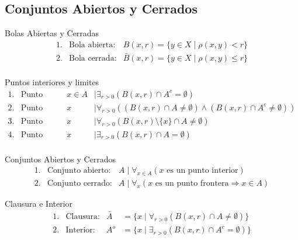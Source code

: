 \documentclass[a4paper,11pt]{article}
\begin{document}
\newpage
\subsection{Conjuntos Abiertos y Cerrados}

\begin{definicion*}{Bolas Abiertas y Cerradas}{}
  \[
  \begin{array}{lll}
    1. & \text{Bola abierta:} & B(x,r) = \{ y \in X \mid \rho(x,y) < r \} \\
    2. & \text{Bola cerrada:} & \bar{B}(x,r) = \{ y \in X \mid \rho(x,y) \leq r \} \\
  \end{array}
  \]
\end{definicion*}

\begin{definicion*}{Puntos interiores y limites}{} 
  \[
  \begin{array}{llll}
    1. & \text{Punto interior:} & x \in A &\mid \exists_{r > 0} (B(x,r) \cap A^c = \emptyset) \\
    2. & \text{Punto frontera:} & x &\mid \forall_{r > 0} ((B(x,r) \cap A \neq \emptyset) \wedge (B(x,r) \cap A^c \neq \emptyset)) \\
    3. & \text{Punto limite:} & x &\mid \forall_{r > 0} (B(x,r)\setminus\{x\} \cap A \neq \emptyset) \\
    4. & \text{Punto exterior:} & x &\mid \exists_{r > 0} (B(x,r) \cap A = \emptyset) \\
  \end{array}
  \]
\end{definicion*}

\begin{definicion*}{Conjuntos Abiertos y Cerrados}{}
  \[
  \begin{array}{lll}
    1. & \text{Conjunto abierto:} & A \mid \forall_{x \in A} (x \text{ es un punto interior}) \\
    2. & \text{Conjunto cerrado:} & A \mid \forall_{x} (x \text{ es un punto frontera} \Rightarrow x \in A)
  \end{array}
  \]
\end{definicion*}

\begin{definicion*}{Clausura e Interior}{}
  \[
  \begin{array}{llll}
    1. & \text{Clausura:} & \bar{A} &= \{ x \mid \forall_{r > 0} (B(x,r) \cap A \neq \emptyset) \} \\
    2. & \text{Interior:} & A^o &= \{ x \mid \exists_{r > 0} (B(x,r) \cap A^c = \emptyset) \} \\
  \end{array}
  \]
\end{definicion*}
\end{document}
